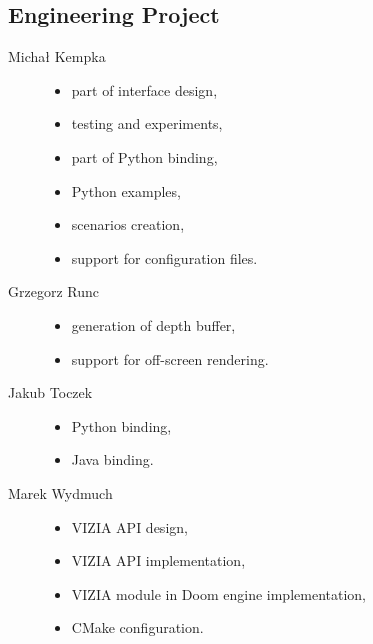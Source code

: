 \documentclass[english,bachelor,a4paper,twoside]{ppfcmthesis}
\begin{document}
	\subsection{Engineering Project}
	\begin{description}
		\item[Michał Kempka] \hfill
			\begin{itemize}
				\item part of interface design,
				\item testing and experiments,
				\item part of Python binding,
				\item Python examples,
				\item scenarios creation,
				\item support for configuration files.
			\end{itemize}
		\item[Grzegorz Runc] \hfill
			\begin{itemize}
				\item generation of depth buffer,
				\item support for off-screen rendering.
			\end{itemize}
		\item[Jakub Toczek] \hfill
			\begin{itemize}
				\item Python binding,
				\item Java binding.
			\end{itemize}
		\item[Marek Wydmuch] \hfill
			\begin{itemize}
				\item VIZIA API design,
				\item VIZIA API implementation,
				\item VIZIA module in Doom engine implementation,
				\item CMake configuration.
			\end{itemize}
	\end{description}
	
   	
\end{document}
